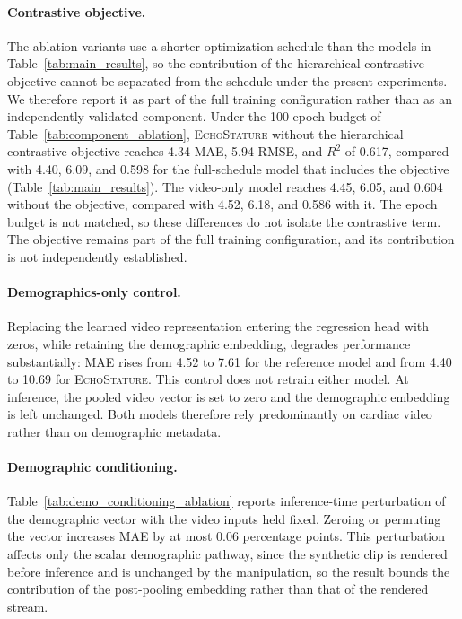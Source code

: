 \documentclass{ws-procs11x85}
\begin{document}
\paragraph{\color{black}Contrastive objective.}
{\color{blue}The ablation variants use a shorter optimization schedule than the models in Table~\ref{tab:main_results}, so the contribution of the hierarchical contrastive objective cannot be separated from the schedule under the present experiments.
We therefore report it as part of the full training configuration rather than as an independently validated component.}
{\color{red}Under the 100-epoch budget of Table~\ref{tab:component_ablation}, \textsc{EchoStature} without the hierarchical contrastive objective reaches 4.34 MAE, 5.94 RMSE, and $R^2$ of 0.617, compared with 4.40, 6.09, and 0.598 for the full-schedule model that includes the objective (Table~\ref{tab:main_results}). The video-only model reaches 4.45, 6.05, and 0.604 without the objective, compared with 4.52, 6.18, and 0.586 with it. The epoch budget is not matched, so these differences do not isolate the contrastive term. The objective remains part of the full training configuration, and its contribution is not independently established.}

\paragraph{Demographics-only control.}
Replacing the learned video representation entering the regression head with zeros, while retaining the demographic embedding, degrades performance substantially: MAE rises from 4.52 to 7.61 for the reference model and from 4.40 to 10.69 for \textsc{EchoStature}. {\color{red}This control does not retrain either model. At inference, the pooled video vector is set to zero and the demographic embedding is left unchanged.}
Both models therefore rely predominantly on cardiac video rather than on demographic metadata.

\paragraph{Demographic conditioning.}
Table~\ref{tab:demo_conditioning_ablation} reports inference-time perturbation of the demographic vector with the video inputs held fixed.
Zeroing or permuting the vector increases MAE by at most 0.06 percentage points.
This perturbation affects only the scalar demographic pathway, since the synthetic clip is rendered before inference and is unchanged by the manipulation, so the result bounds the contribution of the post-pooling embedding rather than that of the rendered stream.
\end{document}
